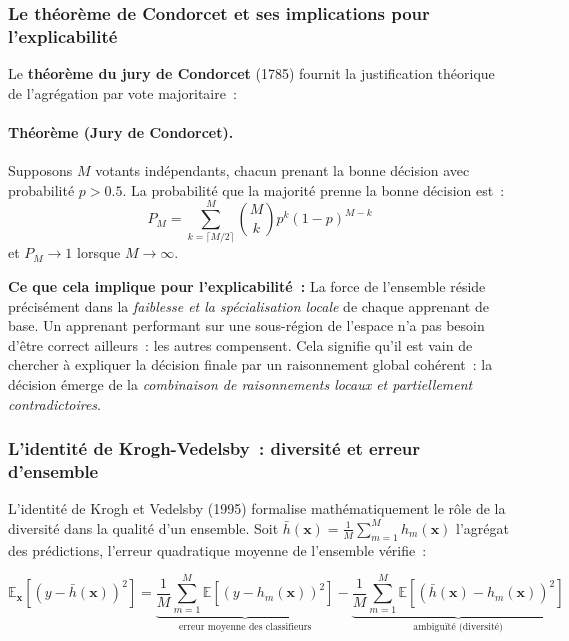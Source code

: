 \subsubsection{Le théorème de Condorcet et ses implications pour l'explicabilité}

Le \textbf{théorème du jury de Condorcet} (1785) fournit la justification théorique
de l'agrégation par vote majoritaire~:

\paragraph{Théorème (Jury de Condorcet).}
Supposons $M$ votants indépendants, chacun prenant la bonne décision avec probabilité
$p > 0.5$. La probabilité que la majorité prenne la bonne décision est~:
\begin{equation}
  P_M = \sum_{k=\lceil M/2 \rceil}^{M} \binom{M}{k} p^k (1-p)^{M-k}
\end{equation}
et $P_M \to 1$ lorsque $M \to \infty$.

\textbf{Ce que cela implique pour l'explicabilité~:} La force de l'ensemble réside
précisément dans la \textit{faiblesse et la spécialisation locale} de chaque apprenant
de base. Un apprenant performant sur une sous-région de l'espace n'a pas besoin d'être
correct ailleurs~: les autres compensent. Cela signifie qu'il est vain de chercher
à expliquer la décision finale par un raisonnement global cohérent~: la décision émerge
de la \textit{combinaison de raisonnements locaux et partiellement contradictoires}.

\subsubsection{L'identité de Krogh-Vedelsby~: diversité et erreur d'ensemble}

L'identité de Krogh et Vedelsby (1995) formalise mathématiquement le rôle de la diversité
dans la qualité d'un ensemble. Soit $\bar{h}(\mathbf{x}) = \frac{1}{M}\sum_{m=1}^M h_m(\mathbf{x})$
l'agrégat des prédictions, l'erreur quadratique moyenne de l'ensemble vérifie~:

\begin{equation}
  \mathbb{E}_{\mathbf{x}}\!\left[(y - \bar{h}(\mathbf{x}))^2\right]
  = \underbrace{\frac{1}{M}\sum_{m=1}^{M} \mathbb{E}\!\left[(y - h_m(\mathbf{x}))^2\right]}_{\text{erreur moyenne des classifieurs}}
  - \underbrace{\frac{1}{M}\sum_{m=1}^{M} \mathbb{E}\!\left[(\bar{h}(\mathbf{x}) - h_m(\mathbf{x}))^2\right]}_{\text{ambiguïté (diversité)}}
  \label{eq:krogh_vedelsby}
\end{equation}

